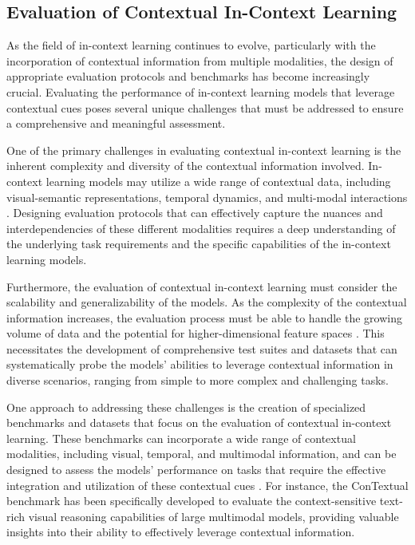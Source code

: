 \documentclass[11pt]{article}
\begin{document}
\subsection{Evaluation of Contextual In-Context Learning}

As the field of in-context learning continues to evolve, particularly with the incorporation of contextual information from multiple modalities, the design of appropriate evaluation protocols and benchmarks has become increasingly crucial. Evaluating the performance of in-context learning models that leverage contextual cues poses several unique challenges that must be addressed to ensure a comprehensive and meaningful assessment.

One of the primary challenges in evaluating contextual in-context learning is the inherent complexity and diversity of the contextual information involved. In-context learning models may utilize a wide range of contextual data, including visual-semantic representations, temporal dynamics, and multi-modal interactions \cite{ref182}. Designing evaluation protocols that can effectively capture the nuances and interdependencies of these different modalities requires a deep understanding of the underlying task requirements and the specific capabilities of the in-context learning models.

Furthermore, the evaluation of contextual in-context learning must consider the scalability and generalizability of the models. As the complexity of the contextual information increases, the evaluation process must be able to handle the growing volume of data and the potential for higher-dimensional feature spaces \cite{ref183}. This necessitates the development of comprehensive test suites and datasets that can systematically probe the models' abilities to leverage contextual information in diverse scenarios, ranging from simple to more complex and challenging tasks.

One approach to addressing these challenges is the creation of specialized benchmarks and datasets that focus on the evaluation of contextual in-context learning. These benchmarks can incorporate a wide range of contextual modalities, including visual, temporal, and multimodal information, and can be designed to assess the models' performance on tasks that require the effective integration and utilization of these contextual cues \cite{ref184}. For instance, the ConTextual benchmark \cite{ref184} has been specifically developed to evaluate the context-sensitive text-rich visual reasoning capabilities of large multimodal models, providing valuable insights into their ability to effectively leverage contextual information.
\end{document}
